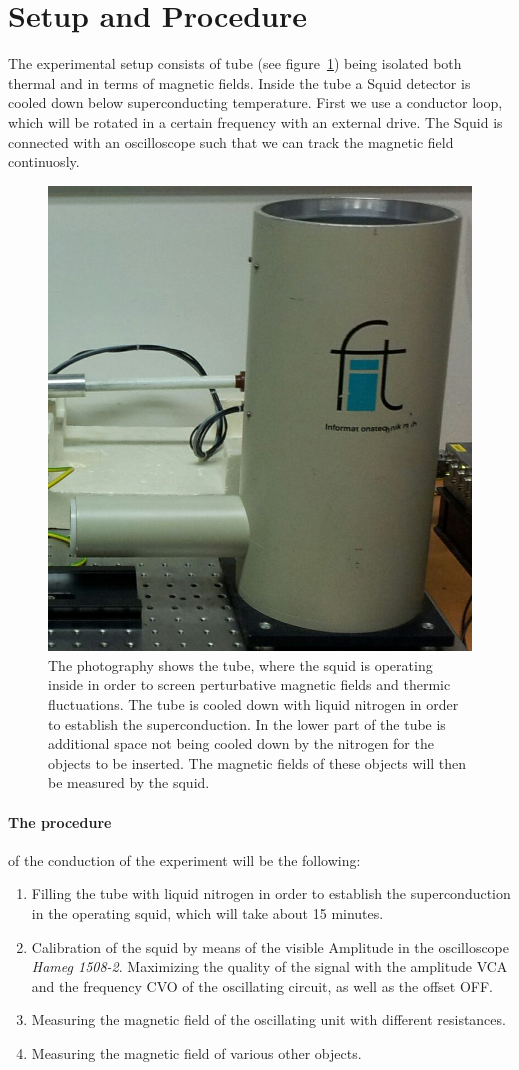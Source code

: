 \section{Setup and Procedure}
The experimental setup consists of tube (see figure~\ref{fig:setup1}) being
isolated both thermal and in terms of magnetic fields. Inside
the tube a Squid detector is cooled down below superconducting temperature.
First we use a conductor loop, which will be rotated in a certain frequency with
an external drive. The Squid is connected with an oscilloscope such that 
we can track the magnetic field continuosly.
\begin{figure}[htpb]
    \centering
    \includegraphics[width=0.5\linewidth]{figures/foto5.jpeg}
    \caption{The photography shows the tube, where the squid is operating inside in order
    to screen perturbative magnetic fields and thermic fluctuations. The tube is cooled down
    with liquid nitrogen in order to establish the superconduction. In the lower part of the
    tube is additional space not being cooled down by the nitrogen for the objects to be inserted.
    The magnetic fields of these objects will then be measured by the squid.}
    \label{fig:setup1}
\end{figure}
\paragraph{The procedure} of the conduction of the experiment will be
the following:
\begin{enumerate}
\item Filling the tube with liquid nitrogen in order to establish the superconduction in the
operating squid, which will take about 15 minutes.
\item Calibration of the squid by means of the visible Amplitude in the oscilloscope \textit{Hameg 1508-2}.
Maximizing the quality of the signal with the amplitude VCA and the frequency CVO of the oscillating circuit, as
well as the offset OFF.
\item Measuring the magnetic field of the oscillating unit with different resistances.
\item Measuring the magnetic field of various other objects.
\end{enumerate}


